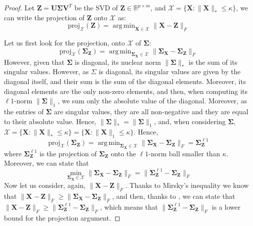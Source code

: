 \documentclass[12pt]{article}
\DeclareMathOperator*{\argmin}{arg\,min}
\newcommand{\boldZ}{\mathbf{Z}}
\newcommand{\boldX}{\mathbf{X}}
\newcommand{\boldU}{\mathbf{U}}
\newcommand{\boldV}{\mathbf{V}}
\newcommand{\setX}{\mathcal{X}}
\newcommand{\boldS}{\mathbf{\Sigma}}
\newcommand*{\proj}{\text{proj}}
\begin{document}
\begin{proof}
Let $\boldZ = \boldU\boldS\boldV^T$ be the SVD of $\boldZ \in \mathbb{R}^{p \times m}$, and $\setX = \{ \boldX : \lVert \boldX \rVert_{*} \leq \kappa \}$, we can write the projection of $\boldZ$ onto $\setX$ as:
\begin{equation}
    \proj_{\setX}(\boldZ) = \argmin_{\boldX \in \setX} \lVert \boldX - \boldZ \rVert_{F}
\end{equation}

Let us first look for the projection, onto $\setX$ of $\boldS$:
\begin{equation}
    \proj_{\setX}(\boldS_{\boldZ}) = \argmin_{\boldS_{\boldX} \in \setX} \lVert \boldS_{\boldX} - \boldS_{\boldZ} \rVert_{F}
\end{equation}
However, given that $\boldS$ is diagonal, its nuclear norm $\lVert \boldS \rVert_{*}$ is the sum of its singular values. However, as $\Sigma$ is diagonal, its singular values are given by the diagonal itself, and their sum is the sum of the diagonal elements. Moreover, its diagonal elements are the only non-zero elements, and then, when computing its $\ell1$-norm $\lVert \boldS \rVert_{1}$, we sum only the absolute value of the diagonal. Moreover, as the entries of $\boldS$ are singular values, they are all non-negative and they are equal to their absolute value. Hence, $\lVert \boldS \rVert_{*} = \lVert \boldS \rVert_{1}$, and, when considering $\boldS$, $\setX = \{ \boldX : \lVert \boldX \rVert_{*} \leq \kappa \} = \{ \boldX : \lVert \boldX \rVert_{1} \leq \kappa \}$. Hence,
\begin{equation}
     \proj_{\setX}(\boldS_{\boldZ}) = \argmin_{\boldS_{\boldX} \in \setX} \lVert \boldS_{\boldX} - \boldS_{\boldZ} \rVert_{F} = \boldS_{\boldZ}^{\ell1}
\end{equation}
where $\boldS_{\boldZ}^{\ell1}$ is the projection of $\boldS_{\boldZ}$ onto the $\ell1$-norm ball smaller than $\kappa$. Moreover, we can state that
\begin{equation}
    \min_{\boldS_{\boldX} \in \setX} \lVert \boldS_{\boldX} - \boldS_{\boldZ} \rVert_{F} = \lVert \boldS_{\boldZ}^{\ell1} - \boldS_{\boldZ} \rVert_{F} \label{eq:sigma-proj}    
\end{equation}
Now let us consider, again, $\lVert \boldX - \boldZ \rVert_{F}$. Thanks to Mirsky's inequality we know that $\lVert \boldX - \boldZ \rVert_{F} \geq \lVert \boldS_{\boldX} - \boldS_{\boldZ} \rVert_{F}$, and then, thanks to , we can state that $\lVert \boldX - \boldZ \rVert_{F} \geq \lVert \boldS_{\boldZ}^{\ell1} - \boldS_{\boldZ} \rVert_{F}$, which means that $\lVert \boldS_{\boldZ}^{\ell1} - \boldS_{\boldZ} \rVert_{F}$ is a lower bound for the projection argument.


\end{proof}
\end{document}
